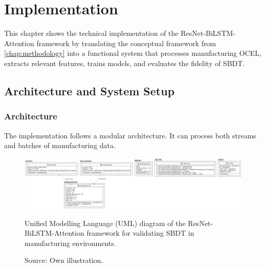 \chapter{Implementation}
\label{chap:implementation}
This chapter shows the technical implementation of the ResNet-BiLSTM-Attention framework \textcite{Fischer2025ResNetBiLSTM} by translating the conceptual framework from \autoref{chap:methodology} into a functional system that processes manufacturing OCEL, extracts relevant features, trains models, and evaluates the fidelity of SBDT.

\section{Architecture and System Setup}

\subsection{Architecture}
The implementation follows a modular architecture. It can process both streams and batches of manufacturing data.

\begin{figure}[htbp]
  \centering
  \includegraphics[width=1\textwidth]{figures/code.png}
  \caption[UML Diagram of the Implementation]{Unified Modelling Language (UML) diagram of the ResNet-BiLSTM-Attention framework for validating SBDT in manufacturing environments.}
  \caption*{Source: Own illustration.}
  \label{fig:uml-diagram}
\end{figure}

